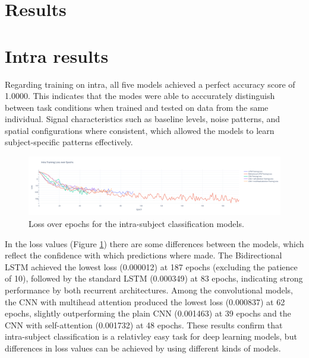 \documentclass[conference]{IEEEtran}
\begin{document}
\section{Results}

\section{Intra results}
Regarding training on intra, all five models achieved a perfect accuracy score of 1.0000. This indicates that the modes were able to acccurately distinguish between task conditions when trained and tested on data from the same individual. Signal characteristics such as baseline levels, noise patterns, and spatial configurations where consistent, which allowed the models to learn subject-specific patterns effectively.

\begin{figure}[t]
    \centering
    \includegraphics[width=\textwidth]{figures/loss_intra_res.png}
    \caption{Loss over epochs for the intra-subject classification models.}
    \label{fig:intra_loss_over_epoch}
\end{figure}

In the loss values (Figure \ref{fig:intra_loss_over_epoch}) there are some differences between the models, which reflect the confidence with which predictions where made. The Bidirectional LSTM achieved the lowest loss (0.000012) at 187 epochs (excluding the patience of 10), followed by the standard LSTM (0.000349) at 83 epochs, indicating strong performance by both recurrent architectures. Among the convolutional models, the CNN with multihead attention produced the lowest loss (0.000837) at 62 epochs, slightly outperforming the plain CNN (0.001463) at 39 epochs and the CNN with self-attention (0.001732) at 48 epochs. These results confirm that intra-subject classification is a relativley easy task for deep learning models, but differences in loss values can be achieved by using different kinds of models.
\end{document}
